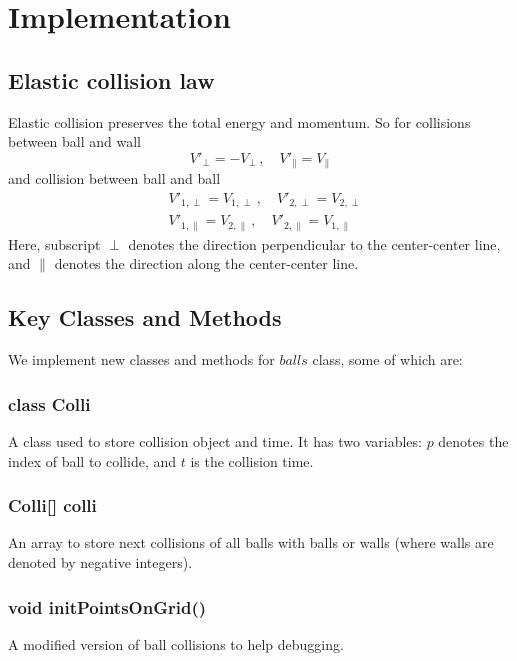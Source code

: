 \documentclass[twoside,11pt]{article}
\begin{document}
\section{Implementation}

\subsection{Elastic collision law}
Elastic collision preserves the total energy and momentum. So 
for collisions between ball and wall 
\begin{equation}
  \label{eq:collisionBW}
  V'_{\perp} = - V_{\perp} \,,\quad V'_{\parallel} = V_{\parallel}
\end{equation}
and collision between ball and ball
\begin{align}
  \label{eq:collisionBB}
  & V'_{1, \perp} = V_{1, \perp} \,,\quad V'_{2, \perp} = V_{2, \perp} \\
  & V'_{1, \parallel} = V_{2, \parallel} \,,\quad V'_{2, \parallel} = V_{1, \parallel}
\end{align}
Here, subscript $\perp$ denotes the direction perpendicular to the
center-center line, and $\parallel$ denotes the direction along the
center-center
line.

\subsection{Key Classes and Methods}
We implement new classes and methods for $balls$ class, some of which are:

\subsubsection{class Colli}
A class used to store collision object and time. It has two variables: $p$ denotes the index of ball to collide, and $t$ is the collision time.

\subsubsection{Colli[] colli}
An array to store next collisions of all balls with balls or walls (where walls are denoted by negative integers).

\subsubsection{void initPointsOnGrid()}
A modified version of ball collisions to help debugging.
\end{document}
